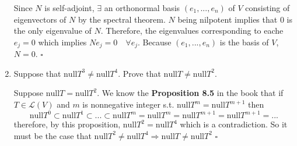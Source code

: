 \documentclass[12pt]{article}
\newenvironment{proof}{\noindent{\bf Proof.}}{\hfill $\square$\medskip}
\begin{document}
\begin{enumerate}
        \begin{proof}
            Since $N$ is self-adjoint, $\exists$ an orthonormal basis $(e_{1},...,e_{n})$ of $V$ consisting of eigenvectors of $N$ by the spectral theorem. $N$ being nilpotent implies that $0$ is the only eigenvalue of $N$. Therefore, the eigenvalues corresponding to eache $e_{j}=0$ which implies $Ne_{j}=0\quad\forall e_{j}$. Because $(e_{1},...,e_{n})$ is the basis of $V$, $N=0$.
        \end{proof}

        \item Suppose that $\text{null}T^{3}\neq\text{null}T^{4}$. Prove that $\text{null}T\neq\text{null}T^{2}$.
        
        \begin{proof}
            Suppose $\text{null}T=\text{null}T^{2}$. We know the \textbf{Proposition 8.5} in the book that if $T\in\mathcal{L}(V)$ and $m$ is nonnegative integer s.t. $\text{null}T^{m}=\text{null}T^{m+1}$ then 
            $$\text{null}T^{0}\subset\text{null}T^{1}\subset...\subset\text{null}T^{m}=\text{null}T^{m}=\text{null}T^{m+1}=\text{null}T^{m+1}=...$$ therefore, by this proposition, $\text{null}T^{2}=\text{null}T^{4}$ which is a contradiction. So it must be the case that $\text{null}T^{2}\neq\text{null}T^{4}\Rightarrow\text{null}T\neq\text{null}T^{2}$
        \end{proof}
    \end{enumerate}
        
\end{document}
